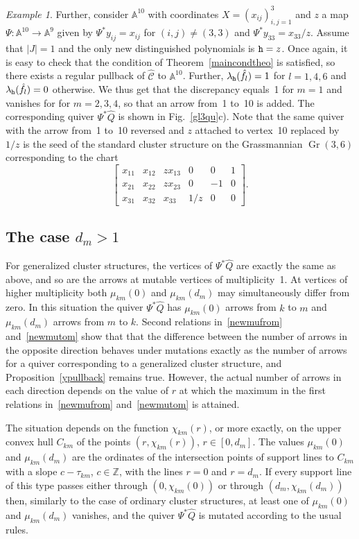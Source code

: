 \documentclass{amsart}
\theoremstyle{definition}
\theoremstyle{remark}
\newtheorem{example}[theorem]{Example}
\numberwithin{equation}{section}
\numberwithin{theorem}{section}
\def\AA{{\mathbb A}}
\def\CC{{\mathcal C}}
\def\Z{{\mathbb Z}}
\def\tth{{\tt h}}
\def\Gr{\operatorname{Gr}}
\begin{document}
\begin{example}
Further, consider $\AA^{10}$ with coordinates $X=(x_{ij})_{i,j=1}^3$ and $z$ a map $\Psi:\AA^{10}\to\AA^9$ given by
$\Psi^*y_{ij}=x_{ij}$ for $(i,j)\ne (3,3)$ and $\Psi^*y_{33}=x_{33}/z$. Assume that $|J|=1$ and the only new distinguished polynomials is $\tth=z$. Once again, it is easy to check that the condition of Theorem~\ref{maincondtheo} is satisfied, so there exists a regular pullback of $\widehat\CC$ to $\AA^{10}$. Further, $\lambda_\tth(\hat f_l)=1$ for $l=1, 4, 6$  and $\lambda_\tth(\hat f_l)=0$ otherwise.  We thus get that the discrepancy equals~1 for
$m=1$ and vanishes for for $m=2,3,4$, so that  an arrow from~1 
to~10 is added. The corresponding quiver $\Psi^*\widehat Q$ is shown in  Fig.~\ref{gl3qu}c). Note that the same quiver with the arrow from~1 to~10 reversed and $z$ attached to vertex~10 replaced by $1/z$ is the seed of the standard cluster structure on the Grassmannian $\Gr(3,6)$ corresponding to the chart
\[
\begin{bmatrix}
x_{11} & x_{12} & zx_{13} & 0 & 0 & 1\\
x_{21} & x_{22} & zx_{23} & 0 & -1 & 0\\
x_{31} & x_{32} & x_{33} & 1/z & 0 & 0
\end{bmatrix}.
\]
\end{example}

\subsection{The case $d_m>1$}\label{almostquiver}
For generalized cluster structures, the vertices of $\Psi^*\widehat Q$ are exactly the same as above, and so are 
the arrows at mutable vertices of multiplicity~1. At vertices of higher multiplicity 
both $\mu_{km}(0)$ and $\mu_{km}(d_m)$ may simultaneously differ from zero.
In this situation the quiver $\Psi^*\widehat Q$ has $\mu_{km}(0)$ arrows from $k$ to $m$ and  
$\mu_{km}(d_m)$ arrows from $m$ to $k$. Second relations in~\eqref{newmufrom} and~\eqref{newmutom} show that that the difference between the number of arrows in the opposite direction behaves under mutations exactly as the number of arrows for a quiver corresponding to a generalized cluster structure, and Proposition~\ref{ypullback} remains true.
However, the actual number of arrows in each direction depends on the value of $r$ at which the maximum in the first relations 
in~\eqref{newmufrom} and~\eqref{newmutom} is attained. 


The situation depends on the function $\chi_{km}(r)$, or more exactly, on the upper convex hull
$C_{km}$ of the points  $(r,\chi_{km}(r))$, $r\in[0,d_m]$. The values $\mu_{km}(0)$ and $\mu_{km}(d_m)$ are the ordinates of the intersection points of support lines to $C_{km}$ with a slope $c-\tau_{km}$, $c\in\Z$, with the lines 
$r=0$ and $r=d_m$. If every support line 
of this type passes either through $(0,\chi_{km}(0))$ or through $(d_m,\chi_{km}(d_m))$ then, similarly to the case of ordinary cluster structures, at least one of $\mu_{km}(0)$ and $\mu_{km}(d_m)$ vanishes, and the quiver 
$\Psi^*\widehat Q$ is mutated according to the usual rules.
\end{document}
